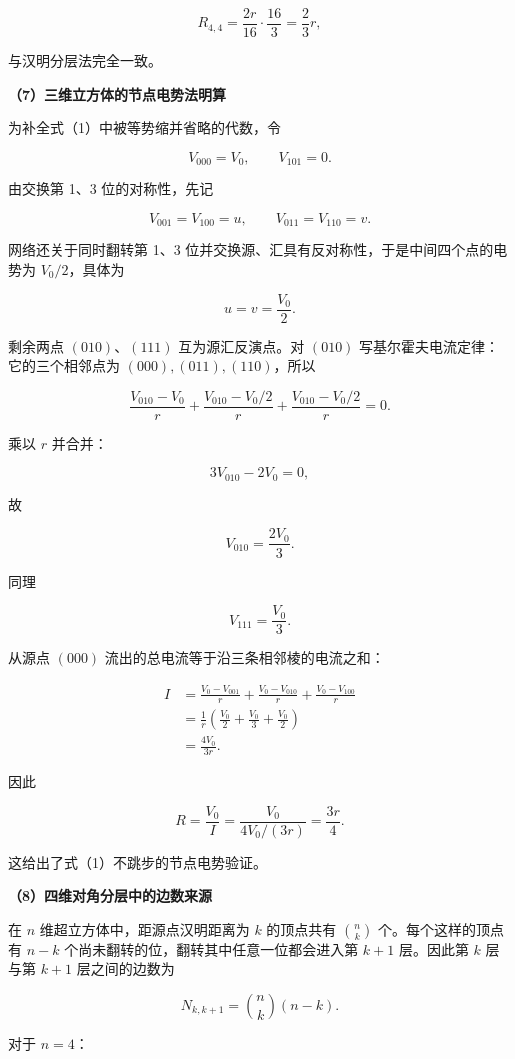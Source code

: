 \documentclass[12pt,a4paper,UTF8]{ctexart}
\begin{document}
\[
R_{4,4}=\frac{2r}{16}\cdot\frac{16}{3}=\frac23r,
\]

与汉明分层法完全一致。

\textbf{（7）三维立方体的节点电势法明算}

为补全式（1）中被等势缩并省略的代数，令

\[
V_{000}=V_0,
\qquad
V_{101}=0.
\]

由交换第 1、3 位的对称性，先记

\[
V_{001}=V_{100}=u,
\qquad
V_{011}=V_{110}=v.
\]

网络还关于同时翻转第 1、3
位并交换源、汇具有反对称性，于是中间四个点的电势为 \(V_0/2\)，具体为

\[
u=v=\frac{V_0}{2}.
\tag{5}
\]

剩余两点 \((010)\)、\((111)\) 互为源汇反演点。对 \((010)\)
写基尔霍夫电流定律：它的三个相邻点为 \((000),(011),(110)\)，所以

\[
\frac{V_{010}-V_0}{r}
+\frac{V_{010}-V_0/2}{r}
+\frac{V_{010}-V_0/2}{r}=0.
\]

乘以 \(r\) 并合并：

\[
3V_{010}-2V_0=0,
\]

故

\[
V_{010}=\frac{2V_0}{3}.
\tag{6}
\]

同理

\[
V_{111}=\frac{V_0}{3}.
\tag{7}
\]

从源点 \((000)\) 流出的总电流等于沿三条相邻棱的电流之和：

\[
\begin{aligned}
I
&=\frac{V_0-V_{001}}r
+\frac{V_0-V_{010}}r
+\frac{V_0-V_{100}}r\\
&=\frac1r\left(
\frac{V_0}{2}+\frac{V_0}{3}+\frac{V_0}{2}
\right)\\
&=\frac{4V_0}{3r}.
\end{aligned}
\tag{8}
\]

因此

\[
R=\frac{V_0}{I}
=\frac{V_0}{4V_0/(3r)}
=\frac{3r}{4}.
\]

这给出了式（1）不跳步的节点电势验证。

\textbf{（8）四维对角分层中的边数来源}

在 \(n\) 维超立方体中，距源点汉明距离为 \(k\) 的顶点共有 \(\binom nk\)
个。每个这样的顶点有 \(n-k\) 个尚未翻转的位，翻转其中任意一位都会进入第
\(k+1\) 层。因此第 \(k\) 层与第 \(k+1\) 层之间的边数为

\[
N_{k,k+1}=\binom nk(n-k).
\tag{9}
\]

对于 \(n=4\)：
\end{document}
